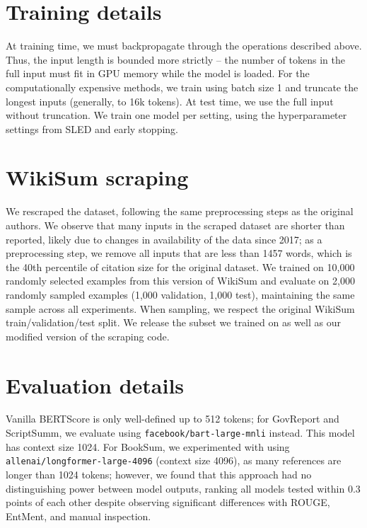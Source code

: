 \documentclass{article}
\begin{document}
\appendix
\section{Training details}
\label{appendix:implementation-details}
At training time, we must backpropagate through the operations described above. Thus, the input length is bounded more strictly -- the number of tokens in the full input must fit in GPU memory while the model is loaded. For the computationally expensive methods, we train using batch size 1 and truncate the longest inputs (generally, to 16k tokens). At test time, 
we use the full input without truncation. We train one model per setting, using the hyperparameter settings from SLED \citep{sled} and early stopping.

\section{WikiSum scraping}
\label{subsec:wikisum-scrape}
We rescraped the dataset, following the same preprocessing steps as the original authors. We observe that many inputs in the scraped dataset are shorter than reported, likely due to changes in availability of the data since 2017; as a preprocessing step, we remove all inputs that are less than 1457 words, which is the 40th percentile of citation size for the original dataset. 
We trained on 10,000 randomly selected examples from this version of WikiSum and evaluate on 2,000 randomly sampled examples (1,000 validation, 1,000 test), maintaining the same sample across all experiments. When sampling, we respect the original WikiSum train/validation/test split.
We release the subset we trained on as well as our modified version of the scraping code. 

\section{Evaluation details}
\label{appendix:evaldetails}
Vanilla BERTScore is only well-defined up to 512 tokens; for GovReport and ScriptSumm, we evaluate using \texttt{facebook/bart-large-mnli} instead. This model has context size 1024. For BookSum, we experimented with using \texttt{allenai/longformer-large-4096} (context size 4096), as many references are longer than 1024 tokens; however, we found that this approach had no distinguishing power between model outputs, ranking all models tested within 0.3 points of each other despite observing significant differences with ROUGE, EntMent, and manual inspection. \\
\end{document}
